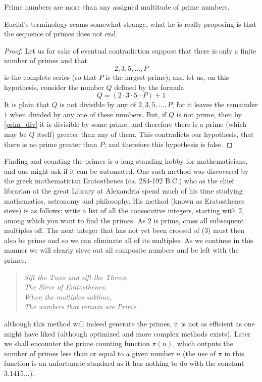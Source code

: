 \begin{prop}
Prime numbers are more than any assigned multitude of prime numbers.
\end{prop}
Euclid's terminology seams somewhat strange, what he is really proposing is that the sequence of primes does not end.
\begin{proof}
Let us for sake of eventual contradiction suppose that there is only a finite number of primes and that
\[
2, 3, 5, ..., P
\]
is the complete series (so that $P$ is the largest prime); and let us, on this hypothesis, consider the number $Q$ defined by the formula
\[
Q = (2 \cdot 3 \cdot 5 \cdots P) + 1
\]
It is plain that $Q$ is not divisible by any of $2, 3, 5, ..., P$; for it leaves the remainder $1$ when divided by any one of these numbers. But, if $Q$ is not  prime, then by \ref{prim_div} it is divisible by some prime, and therefore there is a prime (which may be $Q$ itself) greater than any of them. This contradicts our hypothesis, that there is no prime greater than $P$; and therefore this hypothesis is false.
\end{proof}

Finding and counting the primes is a long standing hobby for mathematicians, and one might ask if it can be automated. One such method was discovered by the greek mathematician Eratosthenes (ca. 284-192 B.C.) who as the chief librarian at the great Library at Alexandria spend much of  his time studying mathematics, astronomy and philosophy. His method (known as Eratosthenes sieve) is as follows; write a list of all the consecutive integers, starting with $2$, among which you want to find the primes. As $2$ is prime, cross all subsequent multiples off. The next integer that has not yet been crossed of (3) must then also be prime and so we can eliminate all of its multiples. As we continue in this manner we will clearly sieve out all composite numbers and be left with the primes.
\begin{verse}\emph{
Sift the Twos and sift the Threes,\\
The Sieve of Eratosthenes.\\
When the multiples sublime,\\
The numbers that remain are Prime.}
\end{verse}
although this method will indeed generate the primes, it is not as efficient as one might have liked (although optimized and more complex methods exists). Later we shall encounter the prime counting function $\pi(n)$,  which outputs the number of primes less than or equal to a given number $n$ (the use of $\pi$ in this function is an unfortunate standard as it has nothing to do with the constant $3.1415...$).


